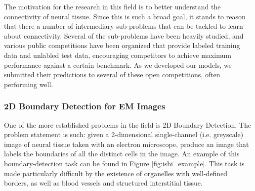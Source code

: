 The motivation for the research in this field is to better understand the connectivity of neural tissue. Since this is such a broad goal, it stands to reason that there a number of intermediary sub-problems that can be tackled to learn about connectivity. Several of the sub-problems have been heavily studied, and various public competitions have been organized that provide labeled training data and unlabled test data, encouraging competitors to achieve maximum performance against a certain benchmark. As we developed our models, we submitted their predictions to several of these open competitions, often performing well.

\medskip

\subsubsection*{2D Boundary Detection for EM Images}

One of the more established problems in the field is 2D Boundary Detection. The problem statement is such: given a 2-dimensional single-channel (i.e. greyscale) image of neural tissue taken with an electron microscope, produce an image that labels the boundaries of all the distinct cells in the image. An example of this boundary-detection task can be found in Figure \ref{fig:isbi_example}. This task is made particularly difficult by the existence of organelles with well-defined borders, as well as blood vessels and structured interstitial tissue.

